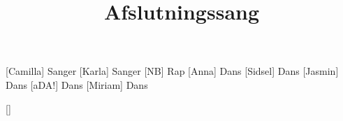 \documentclass[a4paper,11pt]{article}
\title{Afslutningssang\texttrademark}
\begin{document}
\maketitle

\begin{roles}
[Camilla] Sanger
[Karla] Sanger
[NB] Rap
[Anna] Dans
[Sidsel] Dans
[Jasmin] Dans
[aDA!] Dans
[Miriam] Dans
\end{roles}


\begin{props}
	\prop{}[]
\end{props}
\end{document}
